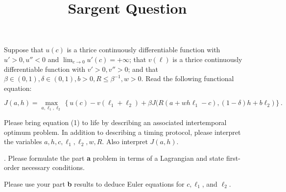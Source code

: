 \documentclass{article} %
\title{Sargent Question} %
\begin{document}
  \maketitle
{} 
Suppose that $u(c)$ is a thrice continuously differentiable function with $u' > 0, u'' < 0$ and $\lim_{c \rightarrow 0} u'(c) = + \infty$;  that $v(\ell)$ is a thrice continuously differentiable function
with $v'> 0, v'' > 0$; and  that $\beta \in (0,1),  \delta \in (0,1), b >0,  R \leq \beta^{-1}, w > 0$.  
Read the following functional equation:

\begin{equation}\label{eqn1}
J(a,h) = \max_{a, \ell_1, \ell_2} \left\{ u(c) - v(\ell_1 + \ell_2) + \beta J \bigl(R(a+ w h \ell_1 - c), (1-\delta)  h + b \ell_2 \bigr) 
  \right\} .
\end{equation}
\medskip

 Please bring equation (1) to life by describing an associated intertemporal optimum problem. In addition to describing a
timing protocol,   please   interpret the variables $a, h, c,  \ell_1, \ell_2, w, R$. Also interpret $J(a,h)$.  %

\medskip
{}. Please formulate  the part {\bf a}  problem in terms of  a Lagrangian and state  first-order necessary  conditions.

\medskip
{} Please use your part {\bf b} results to deduce Euler equations for $c, \ell_1$, and $\ell_2$.  
\end{document}
